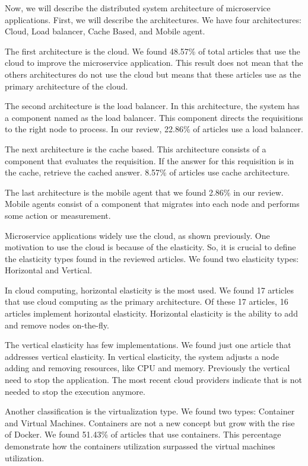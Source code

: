 Now, we will describe the distributed system architecture of microservice applications. First, we will describe the architectures. We have four architectures: Cloud, Load balancer, Cache Based, and Mobile agent.

The first architecture is the cloud. We found 48.57\% of total articles that use the cloud to improve the microservice application. This result does not mean that the others architectures do not use the cloud but means that these articles use as the primary architecture of the cloud.

The second architecture is the load balancer. In this architecture, the system has a component named as the load balancer. This component directs the requisitions to the right node to process. In our review, 22.86\% of articles use a load balancer.

The next architecture is the cache based. This architecture consists of a component that evaluates the requisition. If the answer for this requisition is in the cache, retrieve the cached answer. 8.57\% of articles use cache architecture.

The last architecture is the mobile agent that we found 2.86\% in our review. Mobile agents consist of a component that migrates into each node and performs some action or measurement. 

Microservice applications widely use the cloud, as shown previously. One motivation to use the cloud is because of the elasticity. So, it is crucial to define the elasticity types found in the reviewed articles. We found two elasticity types: Horizontal and Vertical. 

In cloud computing, horizontal elasticity is the most used. We found 17 articles that use cloud computing as the primary architecture. Of these 17 articles, 16 articles implement horizontal elasticity. Horizontal elasticity is the ability to add and remove nodes on-the-fly. 

The vertical elasticity has few implementations. We found just one article that addresses vertical elasticity. In vertical elasticity, the system adjusts a node adding and removing resources, like CPU and memory. Previously the vertical need to stop the application. The most recent cloud providers indicate that is not needed to stop the execution anymore.

Another classification is the virtualization type. We found two types: Container and Virtual Machines. Containers are not a new concept but grow with the rise of Docker. We found 51.43\% of articles that use containers. This percentage demonstrate how the containers utilization surpassed the virtual machines utilization. 

